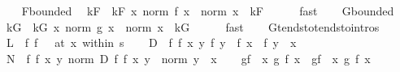 \begin{isabellebody}
\ \ \isamarkupfalse%
\ F{\isachardot}{\kern0pt}bounded\ \isamarkupfalse%
\ kF\ \ kF{\isacharcolon}{\kern0pt}\ {\isachardoublequoteopen}{\isasymAnd}x{\isachardot}{\kern0pt}\ norm\ {\isacharparenleft}{\kern0pt}f{\isacharprime}{\kern0pt}\ x{\isacharparenright}{\kern0pt}\ {\isasymle}\ norm\ x\ {\isacharasterisk}{\kern0pt}\ kF{\isachardoublequoteclose}\isanewline
\ \ \ \ \isamarkupfalse%
\ fast\isanewline
\ \ \isamarkupfalse%
\ G{\isachardot}{\kern0pt}bounded\ \isamarkupfalse%
\ kG\ \ kG{\isacharcolon}{\kern0pt}\ {\isachardoublequoteopen}{\isasymAnd}x{\isachardot}{\kern0pt}\ norm\ {\isacharparenleft}{\kern0pt}g{\isacharprime}{\kern0pt}\ x{\isacharparenright}{\kern0pt}\ {\isasymle}\ norm\ x\ {\isacharasterisk}{\kern0pt}\ kG{\isachardoublequoteclose}\isanewline
\ \ \ \ \isamarkupfalse%
\ fast\isanewline
\ \ \isamarkupfalse%
\ G{\isachardot}{\kern0pt}tendsto{\isacharbrackleft}{\kern0pt}tendsto{\isacharunderscore}{\kern0pt}intros{\isacharbrackright}{\kern0pt}\isanewline
\isanewline
\ \ \isamarkupfalse%
\ {\isacharquery}{\kern0pt}L\ {\isacharequal}{\kern0pt}\ {\isachardoublequoteopen}{\isasymlambda}f{\isachardot}{\kern0pt}\ {\isacharparenleft}{\kern0pt}f\ {\isasymlonglongrightarrow}\ {}{\isacharparenright}{\kern0pt}\ {\isacharparenleft}{\kern0pt}at\ x\ within\ s{\isacharparenright}{\kern0pt}{\isachardoublequoteclose}\isanewline
\ \ \isamarkupfalse%
\ {\isacharquery}{\kern0pt}D\ {\isacharequal}{\kern0pt}\ {\isachardoublequoteopen}{\isasymlambda}f\ f{\isacharprime}{\kern0pt}\ x\ y{\isachardot}{\kern0pt}\ {\isacharparenleft}{\kern0pt}f\ y\ {\isacharminus}{\kern0pt}\ f\ x{\isacharparenright}{\kern0pt}\ {\isacharminus}{\kern0pt}\ f{\isacharprime}{\kern0pt}\ {\isacharparenleft}{\kern0pt}y\ {\isacharminus}{\kern0pt}\ x{\isacharparenright}{\kern0pt}{\isachardoublequoteclose}\isanewline
\ \ \isamarkupfalse%
\ {\isacharquery}{\kern0pt}N\ {\isacharequal}{\kern0pt}\ {\isachardoublequoteopen}{\isasymlambda}f\ f{\isacharprime}{\kern0pt}\ x\ y{\isachardot}{\kern0pt}\ norm\ {\isacharparenleft}{\kern0pt}{\isacharquery}{\kern0pt}D\ f\ f{\isacharprime}{\kern0pt}\ x\ y{\isacharparenright}{\kern0pt}\ {\isacharslash}{\kern0pt}\ norm\ {\isacharparenleft}{\kern0pt}y\ {\isacharminus}{\kern0pt}\ x{\isacharparenright}{\kern0pt}{\isachardoublequoteclose}\isanewline
\ \ \isamarkupfalse%
\ {\isacharquery}{\kern0pt}gf\ {\isacharequal}{\kern0pt}\ {\isachardoublequoteopen}{\isasymlambda}x{\isachardot}{\kern0pt}\ g\ {\isacharparenleft}{\kern0pt}f\ x{\isacharparenright}{\kern0pt}{\isachardoublequoteclose}\ \ {\isacharquery}{\kern0pt}gf{\isacharprime}{\kern0pt}\ {\isacharequal}{\kern0pt}\ {\isachardoublequoteopen}{\isasymlambda}x{\isachardot}{\kern0pt}\ g{\isacharprime}{\kern0pt}\ {\isacharparenleft}{\kern0pt}f{\isacharprime}{\kern0pt}\ x{\isacharparenright}{\kern0pt}{\isachardoublequoteclose}\isanewline

\end{isabellebody}
